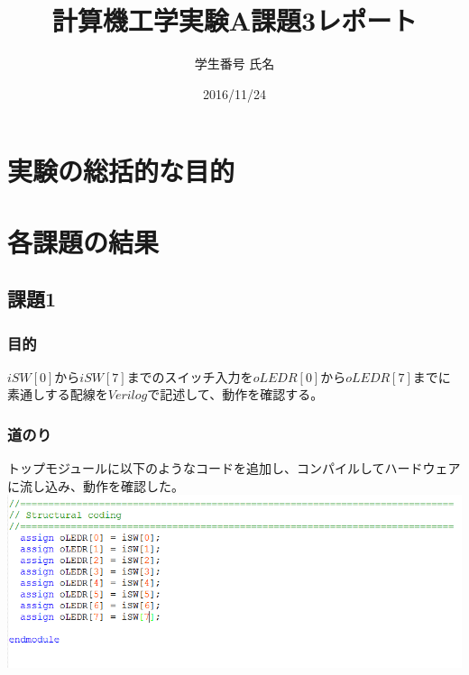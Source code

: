 \documentclass[a4paper]{jarticle}
\title{計算機工学実験A課題3レポート}
\author{学生番号 氏名}
\date{2016/11/24}
\begin{document}
\maketitle
\section{実験の総括的な目的}
\section{各課題の結果}
\subsection{課題1}
\subsubsection{目的}
$iSW[0]$から$iSW[7]$までのスイッチ入力を$oLEDR[0]$から$oLEDR[7]$までに素通しする配線を$Verilog$で記述して、動作を確認する。
\subsubsection{道のり}
トップモジュールに以下のようなコードを追加し、コンパイルしてハードウェアに流し込み、動作を確認した。
\includegraphics[width=15cm]{work1/1.PNG}
\end{document}

